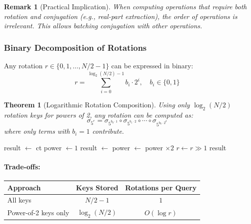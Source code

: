 \documentclass[11pt,a4paper]{article}
\newtheorem{theorem}{Theorem}
\newtheorem{remark}{Remark}
\begin{document}
\begin{remark}[Practical Implication]
When computing operations that require both rotation and conjugation (e.g., real-part extraction), the order of operations is irrelevant. This allows batching conjugation with other operations.
\end{remark}

\subsubsection{Binary Decomposition of Rotations}

Any rotation $r \in \{0, 1, \ldots, N/2 - 1\}$ can be expressed in binary:
\[
r = \sum_{i=0}^{\log_2(N/2)-1} b_i \cdot 2^i, \quad b_i \in \{0, 1\}
\]

\begin{theorem}[Logarithmic Rotation Composition]
Using only $\log_2(N/2)$ rotation keys for powers of 2, any rotation can be computed as:
\[
\sigma_{5^r} = \sigma_{5^{b_0 \cdot 1}} \circ \sigma_{5^{b_1 \cdot 2}} \circ \cdots \circ \sigma_{5^{b_k \cdot 2^k}}
\]
where only terms with $b_i = 1$ contribute.
\end{theorem}

\begin{algorithm}[H]
\caption{Binary Rotation Decomposition}
\begin{algorithmic}[1]
    \State result $\gets$ ct
    \State power $\gets 1$
            \State result $\gets$ 
        \EndIf
        \State power $\gets$ power $\times 2$
        \State $r \gets r \gg 1$
    \EndWhile
    \State \Return result
\EndFunction
\end{algorithmic}
\end{algorithm}

\paragraph{Trade-offs:}
\begin{center}
\begin{tabular}{lcc}
\toprule
\textbf{Approach} & \textbf{Keys Stored} & \textbf{Rotations per Query} \\
\midrule
All keys & $N/2 - 1$ & $1$ \\
Power-of-2 keys only & $\log_2(N/2)$ & $O(\log r)$ \\
\bottomrule
\end{tabular}
\end{center}
\end{document}
